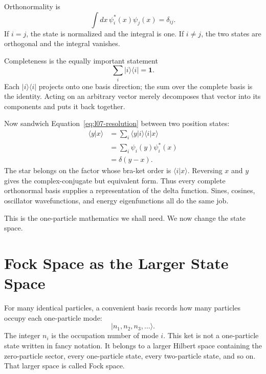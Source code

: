 Orthonormality is
\begin{equation}
\int dx\,\psi_i^*(x)\psi_j(x)=\delta_{ij}.
\label{eq:l07-orthonormality}
\end{equation}
If \(i=j\), the state is normalized and the integral is one. If \(i\ne j\), the two states are orthogonal and the integral vanishes.

Completeness is the equally important statement
\begin{equation}
\sum_i |i\rangle\langle i|=\mathbf 1.
\label{eq:l07-resolution}
\end{equation}
Each \(|i\rangle\langle i|\) projects onto one basis direction; the sum over the complete basis is the identity. Acting on an arbitrary vector merely decomposes that vector into its components and puts it back together.

Now sandwich Equation~\eqref{eq:l07-resolution} between two position states:
\begin{align}
\langle y|x\rangle
&=\sum_i\langle y|i\rangle\langle i|x\rangle \\
&=\sum_i\psi_i(y)\psi_i^*(x) \\
&=\delta(y-x).
\label{eq:l07-position-completeness}
\end{align}
The star belongs on the factor whose bra-ket order is \(\langle i|x\rangle\). Reversing \(x\) and \(y\) gives the complex-conjugate but equivalent form. Thus every complete orthonormal basis supplies a representation of the delta function. Sines, cosines, oscillator wavefunctions, and energy eigenfunctions all do the same job.

\begin{classroomqa}
\end{classroomqa}

This is the one-particle mathematics we shall need. We now change the state space.

\section{Fock Space as the Larger State Space}

For many identical particles, a convenient basis records how many particles occupy each one-particle mode:
\begin{equation}
|n_1,n_2,n_3,\ldots\rangle.
\label{eq:l07-fock-basis}
\end{equation}
The integer \(n_i\) is the occupation number of mode \(i\). This ket is not a one-particle state written in fancy notation. It belongs to a larger Hilbert space containing the zero-particle sector, every one-particle state, every two-particle state, and so on. That larger space is called Fock space.

